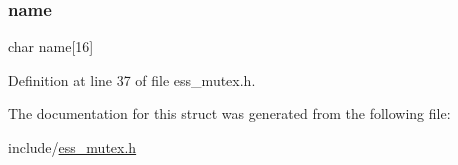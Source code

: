 \subsubsection{\texorpdfstring{name}{name}}
{\footnotesize\ttfamily char name\mbox{[}16\mbox{]}}



Definition at line 37 of file ess\+\_\+mutex.\+h.



The documentation for this struct was generated from the following file\+:\begin{DoxyCompactItemize}
\item 
include/\hyperlink{ess__mutex_8h}{ess\+\_\+mutex.\+h}\end{DoxyCompactItemize}
